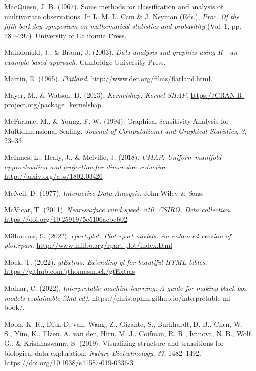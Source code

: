 \documentclass[
  letterpaper,
]{krantz}
\newlength{\cslhangindent}
\newenvironment{CSLReferences}[2] %
 {\begin{list}{}{%
  \setlength{\itemindent}{0pt}
  \setlength{\leftmargin}{0pt}
  \setlength{\parsep}{0pt}
  \ifodd #1
   \setlength{\leftmargin}{\cslhangindent}
   \setlength{\itemindent}{-1\cslhangindent}
  \fi
  \setlength{\itemsep}{#2\baselineskip}}}
 {\end{list}}
\begin{document}
\begin{CSLReferences}{1}{0}
MacQueen, J. B. (1967). Some methods for classification and analysis of
multivariate observations. In L. M. L. Cam \& J. Neyman (Eds.),
\emph{Proc. Of the fifth berkeley symposium on mathematical statistics
and probability} (Vol. 1, pp. 281--297). University of California Press.

Maindonald, J., \& Braun, J. (2003). \emph{Data analysis and graphics
using {R} - an example-based approach}. Cambridge University Press.

Martin, E. (1965). \emph{Flatland}.
http://www.der.org/films/flatland.html.

Mayer, M., \& Watson, D. (2023). \emph{Kernelshap: Kernel SHAP}.
\url{https://CRAN.R-project.org/package=kernelshap}

McFarlane, M., \& Young, F. W. (1994). Graphical {S}ensitivity
{A}nalysis for {M}ultidimensional {S}caling. \emph{Journal of
Computational and Graphical Statistics}, \emph{3}, 23--33.

McInnes, L., Healy, J., \& Melville, J. (2018). \emph{{UMAP}: Uniform
manifold approximation and projection for dimension reduction}.
\url{http://arxiv.org/abs/1802.03426}

McNeil, D. (1977). \emph{Interactive {D}ata {A}nalysis}. John Wiley \&
Sons.

McVicar, T. (2011). \emph{Near-surface wind speed. v10. CSIRO. Data
collection.} \url{https://doi.org/10.25919/5c5106acbcb02}

Milborrow, S. (2022). \emph{{rpart.plot}: Plot rpart models: An enhanced
version of plot.rpart}. \url{http://www.milbo.org/rpart-plot/index.html}

Mock, T. (2022). \emph{{gtExtras}: Extending gt for beautiful HTML
tables}. \url{https://github.com/jthomasmock/gtExtras}

Molnar, C. (2022). \emph{Interpretable machine learning: A guide for
making black box models explainable (2nd ed)}.
https://christophm.github.io/interpretable-ml-book/.

Moon, K. R., Dijk, D. van, Wang, Z., Gigante, S., Burkhardt, D. B.,
Chen, W. S., Yim, K., Elzen, A. van den, Hirn, M. J., Coifman, R. R.,
Ivanova, N. B., Wolf, G., \& Krishnaswamy, S. (2019). Visualizing
structure and transitions for biological data exploration. \emph{Nature
Biotechnology}, \emph{37}, 1482--1492.
\url{https://doi.org/10.1038/s41587-019-0336-3}


\end{CSLReferences}
\end{document}
